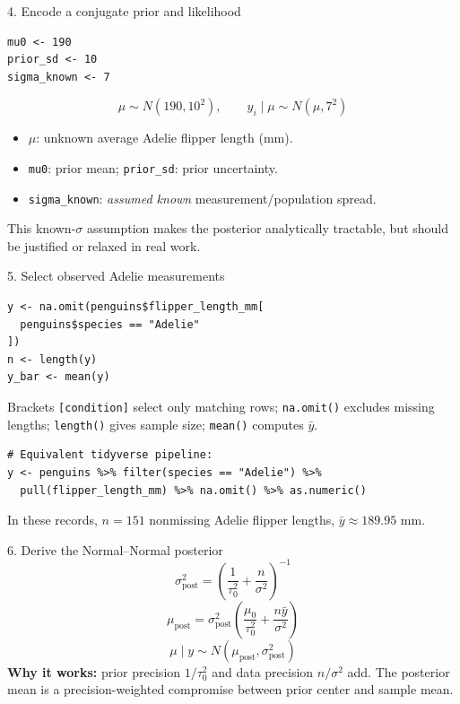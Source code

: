 \documentclass[aspectratio=43,10pt]{beamer}
\newcommand{\take}[1]{\begin{block}{}#1\end{block}}
\begin{document}
\begin{frame}[fragile]{4. Encode a conjugate prior and likelihood}
\begin{lstlisting}
mu0 <- 190
prior_sd <- 10
sigma_known <- 7
\end{lstlisting}
\[\mu\sim N(190,10^2),\qquad y_i\mid\mu\sim N(\mu,7^2)\]
\vspace{-3ex}
\begin{itemize}\item \(\mu\): unknown average Adelie flipper length (mm).
\item \texttt{mu0}: prior mean; \texttt{prior\_sd}: prior uncertainty.
\item \texttt{sigma\_known}: \emph{assumed known} measurement/population spread.
\end{itemize}
\small This known-\(\sigma\) assumption makes the posterior analytically tractable, but should be justified or relaxed in real work.
\end{frame}

\begin{frame}[fragile]{5. Select observed Adelie measurements}
\begin{lstlisting}
y <- na.omit(penguins$flipper_length_mm[
  penguins$species == "Adelie"
])
n <- length(y)
y_bar <- mean(y)
\end{lstlisting}
\small Brackets \texttt{[condition]} select only matching rows; \texttt{na.omit()} excludes missing lengths; \texttt{length()} gives sample size; \texttt{mean()} computes \(\bar y\).\par
\begin{lstlisting}
# Equivalent tidyverse pipeline:
y <- penguins %>% filter(species == "Adelie") %>%
  pull(flipper_length_mm) %>% na.omit() %>% as.numeric()
\end{lstlisting}
\vspace{-3ex}
\take{In these records, \(n=151\) nonmissing Adelie flipper lengths, \(\bar y\approx189.95\) mm.}
\end{frame}

\begin{frame}{6. Derive the Normal--Normal posterior}
\[\sigma_{\mathrm{post}}^2=\left(\frac1{\tau_0^2}+\frac n{\sigma^2}\right)^{-1}\]
\[\mu_{\mathrm{post}}=\sigma_{\mathrm{post}}^2\left(\frac{\mu_0}{\tau_0^2}+\frac{n\bar y}{\sigma^2}\right)\]
\[\mu\mid y\sim N(\mu_{\mathrm{post}},\sigma_{\mathrm{post}}^2)\]
\small \textbf{Why it works:} prior precision \(1/\tau_0^2\) and data precision \(n/\sigma^2\) add. The posterior mean is a precision-weighted compromise between prior center and sample mean.
\end{frame}
\end{document}
